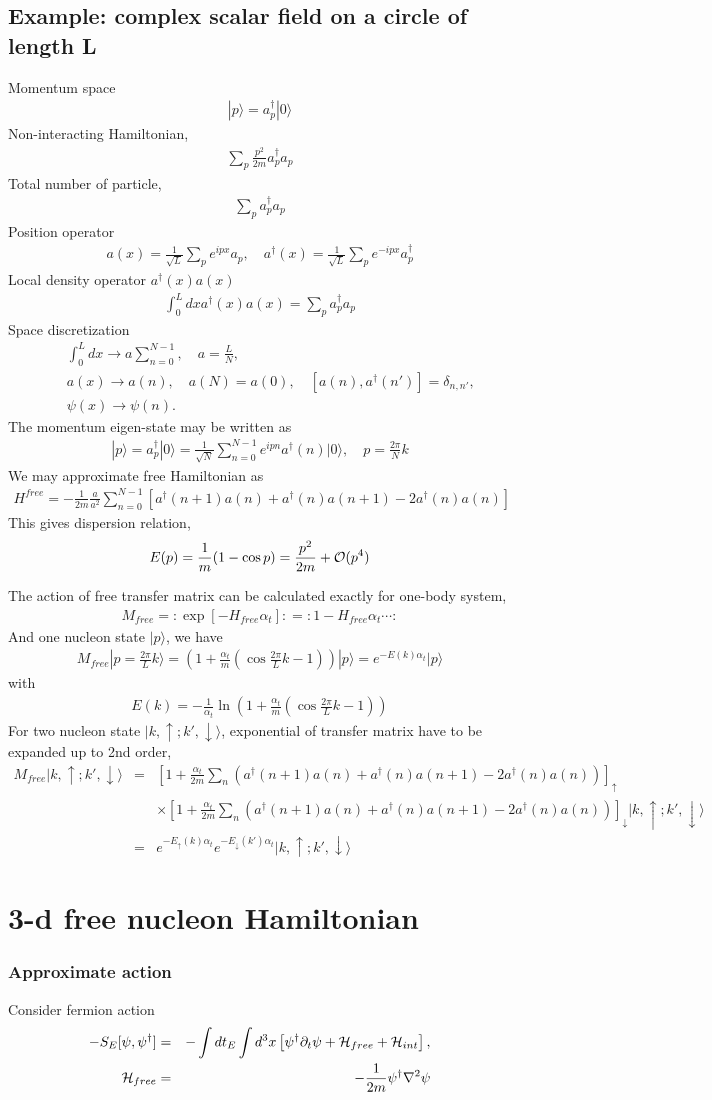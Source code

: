 \documentclass[10pt]{book}
\newcommand{\bea}{\begin{eqnarray}}
\newcommand{\eea}{\end{eqnarray}}
\newcommand{\no}{\nonumber \\}
\newcommand{\del}{\partial}
\def\ra{\rangle}
\begin{document}
\subsection{Example: complex scalar field on a circle of length L}
Momentum space
\bea 
|p\ra = a_p^\dagger|0\ra 
\eea 
Non-interacting Hamiltonian,
\bea 
\sum_p \frac{p^2}{2m}a_p^\dagger a_p
\eea 
Total number of particle,
\bea 
\sum_p a_p^\dagger a_p
\eea 
Position operator
\bea 
a(x)=\frac{1}{\sqrt{L}}\sum_p e^{ipx}a_p,\quad 
a^\dagger(x)=\frac{1}{\sqrt{L}}\sum_p e^{-ipx}a_p^\dagger 
\eea 
Local density operator $a^\dagger(x) a(x)$
\bea 
\int_0^L dx a^\dagger(x) a(x)=\sum_p a^\dagger_p a_p
\eea 
Space discretization
\bea 
& &\int_0^L dx\to a \sum_{n=0}^{N-1},\quad a=\frac{L}{N},\no 
& &a(x)\to a(n),\quad a(N)=a(0),\quad [a(n),a^\dagger(n')]=\delta_{n,n'},\no 
& &\psi(x)\to \psi(n).
\eea 
The momentum eigen-state may be written as
\bea 
|p\ra = a^\dagger_p|0\ra=\frac{1}{\sqrt{N}}\sum_{n=0}^{N-1} e^{ipn}a^\dagger(n)|0\ra,\quad p=\frac{2\pi}{N}k 
\eea 
We may approximate free Hamiltonian as
\bea 
H^{free}=-\frac{1}{2m}\frac{a}{a^2}\sum_{n=0}^{N-1}[ a^\dagger(n+1) a(n)+a^\dagger(n) a(n+1) -2a^\dagger(n) a(n) ] 
\eea 
This gives dispersion relation, 
\bea 
E(p)=\frac{1}{m}(1-\cos p)=\frac{p^2}{2m}+{\cal O}(p^4)
\eea 

The action of free transfer matrix can be calculated exactly for one-body system,
\bea 
M_{free}=:\exp[-H_{free}\alpha_t]: =:1 -H_{free}\alpha_t\cdots :
\eea 
And one nucleon state $|p\ra$, we have
\bea 
M_{free}|p=\frac{2\pi}{L}k \ra =\left(1+\frac{\alpha_t}{m}(\cos \frac{2\pi}{L}k-1)\right) |p\ra 
          =e^{-E(k)\alpha_t}|p\ra 
\eea 
with 
\bea 
E(k)=-\frac{1}{\alpha_t}\ln\left(1+\frac{\alpha_t}{m}(\cos \frac{2\pi}{L}k-1)\right) 
\eea 
For two nucleon state $|k,\uparrow;k',\downarrow\ra$, exponential of transfer matrix have to be expanded up to 
2nd order, 
\bea 
M_{free}|k,\uparrow;k',\downarrow\ra
&=& \left[1+\frac{\alpha_t}{2m}\sum_{n}(a^\dagger(n+1) a(n)+a^\dagger(n)a(n+1)-2 a^\dagger(n) a(n))\right]_{\uparrow}
    \no & &\times  
\left[1+\frac{\alpha_t}{2m}\sum_{n}(a^\dagger(n+1) a(n)+a^\dagger(n)a(n+1)-2 a^\dagger(n) a(n))\right]_{\downarrow}
 |k,\uparrow;k',\downarrow\ra \no 
& =& e^{-E_\uparrow(k)\alpha_t}e^{-E_\downarrow(k')\alpha_t}|k,\uparrow;k',\downarrow\ra
\eea 
\newpage 
\section{3-d free nucleon Hamiltonian}
\subsubsection{Approximate action} 
Consider fermion action
\bea 
-S_E[\psi,\psi^\dagger]&=& -\int dt_E \int d^3 x\left[ \psi^\dagger \del_t\psi 
         +{\cal H}_{free}+{\cal H}_{int}  \right]    ,\no
{\cal H}_{free} &=& -\frac{1}{2m}\psi^\dagger \nabla^2 \psi        
\eea 
\end{document}
